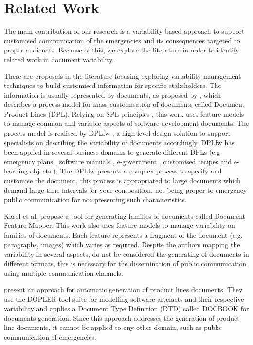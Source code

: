 \section{Related Work}\label{sec:relatedWork}
The main contribution of our research is a variability based approach to support customised communication of the emergencies and its consequences targeted to proper audiences. Because of this, we explore the literature in order to identify related work in document variability.

There are proposals in the literature focusing exploring variability management techniques to build customised information for specific stakeholders. The information is usually represented by documents, as proposed by  \cite{penades2010}, which describes a process model for mass customisation of documents called Document Product Lines (DPL). Relying on SPL principles \citep{clements2002}, this work uses feature models \citep{Kang1990} to manage common and variable aspects of software development documents. The process model is realised by  DPLfw \citep{gomez2012dplfw}, a high-level design solution to support specialists on describing the variability of documents accordingly. DPLfw has been applied in several business domains to generate different DPLs (e.g. emergency plans \citep{gomez2012dplfw}, software manuals \citep{penades2012}, e-government \citep{penades2014},  customised recipes \citep{canos2013} and e-learning objects \citep{labib2015}). The DPLfw presents a complex process to specify and customise the document, this process is appropriated to large documents which demand large time intervals for your composition, not being proper to emergency public communication for not presenting such characteristics.

Karol et al. \citep{Karol2010} propose a tool for generating families of documents called Document Feature Mapper. This work also uses feature models to manage variability on families of documents. Each feature represents a fragment of the document (e.g. paragraphs, images) which varies as required. Despite the authors mapping the variability in several aspects, do not be considered the generating of documents in different formats, this is necessary for the dissemination of public communication using multiple communication channels. 

\cite{Rabiser2010} present an approach for automatic generation of product lines documents. They use the DOPLER \citep{rabiser2009} tool suite for modelling software artefacts and their respective variability and applies a Document Type Definition (DTD) called DOCBOOK \citep{walsh1999} for documents generation. Since this approach addresses the generation of product line documents, it cannot be applied to any other domain, such as public communication of emergencies.

